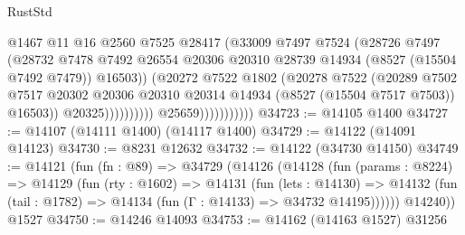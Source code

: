\begin{lexlean}{RustStd}
\begin{coremodule}
                                          @1467
                                          @11
                                          @16
                                          @2560
                                          @7525
                                          @28417
                                          (@33009
                                            @7497
                                            @7524
                                            (@28726
                                              @7497
                                              (@28732
                                                @7478
                                                @7492
                                                @26554
                                                @20306
                                                @20310
                                                @28739
                                                @14934
                                                (@8527 (@15504 @7492 @7479))
                                                @16503))
                                            (@20272
                                              @7522
                                              @1802
                                              (@20278
                                                @7522
                                                (@20289
                                                  @7502
                                                  @7517
                                                  @20302
                                                  @20306
                                                  @20310
                                                  @20314
                                                  @14934
                                                  (@8527 (@15504 @7517 @7503))
                                                  @16503))
                                              @20325))))))))))
                          @25659)))))))))))
@34723 := @14105 @1400
@34727 := @14107 (@14111 @1400) (@14117 @1400)
@34729 := @14122 (@14091 @14123)
@34730 := @8231 @12632
@34732 := @14122 (@34730 @14150)
@34749 := @14121
    (fun (fn : @89) =>
    @34729
      (@14126
        (@14128
          (fun (params : @8224) =>
          @14129
            (fun (rty : @1602) =>
            @14131
              (fun (lets : @14130) =>
              @14132 (fun (tail : @1782) => @14134 (fun (Γ : @14133) => @34732 @14195))))))
        @14240))
    @1527
@34750 := @14246 @14093
@34753 := @14162 (@14163 @1527) @31256

\end{coremodule}
\end{lexlean}
